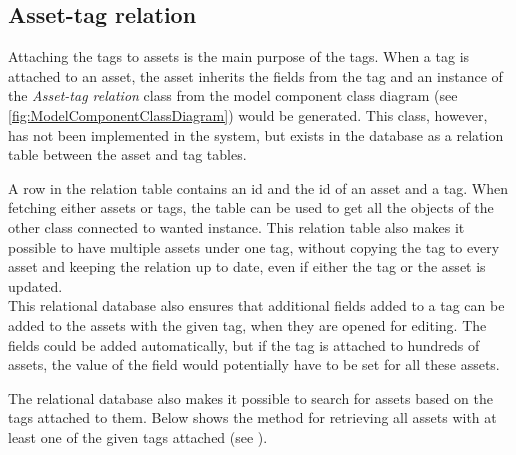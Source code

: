 \subsection{Asset-tag relation}
Attaching the tags to assets is the main purpose of the tags. When a tag is attached to an asset, the asset inherits the fields from the tag and an instance of the \textit{Asset-tag relation} class from the model component class diagram (see \autoref{fig:ModelComponentClassDiagram}) would be generated. This class, however, has not been implemented in the system, but exists in the database as a relation table between the asset and tag tables.
\par
A row in the relation table contains an id and the id of an asset and a tag. When fetching either assets or tags, the table can be used to get all the objects of the other class connected to wanted instance. This relation table also makes it possible to have multiple assets under one tag, without copying the tag to every asset and keeping the relation up to date, even if either the tag or the asset is updated.\\
This relational database also ensures that additional fields added to a tag can be added to the assets with the given tag, when they are opened for editing. The fields could be added automatically, but if the tag is attached to hundreds of assets, the value of the field would potentially have to be set for all these assets.
\par
The relational database also makes it possible to search for assets based on the tags attached to them. Below shows the method for retrieving all assets with at least one of the given tags attached (see ).

